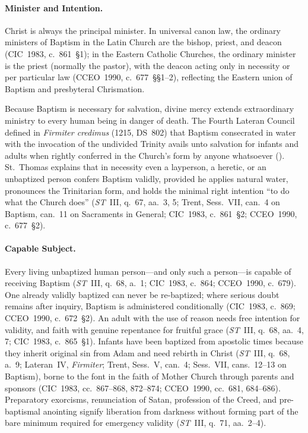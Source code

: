 \paragraph{Minister and Intention.}
Christ is always the principal minister. In universal canon law, the ordinary ministers of Baptism in the Latin Church are the bishop, priest, and deacon (CIC~1983, c.~861~\S1); in the Eastern Catholic Churches, the ordinary minister is the priest (normally the pastor), with the deacon acting only in necessity or per particular law (CCEO~1990, c.~677~\S\S1--2), reflecting the Eastern union of Baptism and presbyteral Chrismation.

Because Baptism is necessary for salvation, divine mercy extends extraordinary ministry to every human being in danger of death. The Fourth Lateran Council defined in \emph{Firmiter credimus} (1215, DS~802) that Baptism consecrated in water with the invocation of the undivided Trinity avails unto salvation for infants and adults when rightly conferred in the Church's form by anyone whatsoever (). St.~Thomas explains that in necessity even a layperson, a heretic, or an unbaptized person confers Baptism validly, provided he applies natural water, pronounces the Trinitarian form, and holds the minimal right intention ``to do what the Church does'' (\emph{ST}~III, q.~67, aa.~3, 5; Trent, Sess.~VII, can.~4 on Baptism, can.~11 on Sacraments in General; CIC~1983, c.~861~\S2; CCEO~1990, c.~677~\S2).

\paragraph{Capable Subject.}
Every living unbaptized human person---and only such a person---is capable of receiving Baptism (\emph{ST}~III, q.~68, a.~1; CIC~1983, c.~864; CCEO~1990, c.~679). One already validly baptized can never be re-baptized; where serious doubt remains after inquiry, Baptism is administered conditionally (CIC~1983, c.~869; CCEO~1990, c.~672~\S2). An adult with the use of reason needs free intention for validity, and faith with genuine repentance for fruitful grace (\emph{ST}~III, q.~68, aa.~4, 7; CIC~1983, c.~865~\S1). Infants have been baptized from apostolic times because they inherit original sin from Adam and need rebirth in Christ (\emph{ST}~III, q.~68, a.~9; Lateran~IV, \emph{Firmiter}; Trent, Sess.~V, can.~4; Sess.~VII, cans.~12--13 on Baptism), borne to the font in the faith of Mother Church through parents and sponsors (CIC~1983, cc.~867--868, 872--874; CCEO~1990, cc.~681, 684--686). Preparatory exorcisms, renunciation of Satan, profession of the Creed, and pre-baptismal anointing signify liberation from darkness without forming part of the bare minimum required for emergency validity (\emph{ST}~III, q.~71, aa.~2--4).

